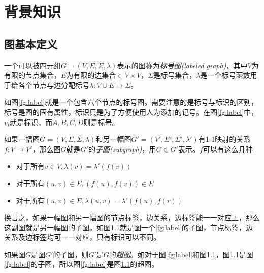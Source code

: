 \documentclass{XDBAthesis}
\begin{document}
\else
\fi
\chapter{背景知识}
\label{chap:background}
\section{图基本定义}
\begin{defn}[标号图]\cite{ghash}
    一个可以被四元组$G=(V,E,\Sigma,\lambda)$表示的图称为\emph{标号图(labeled graph)}，其中$V$为有限的节点集合，$E$为有限的边集合$\in V\times V$，$\Sigma$是标号集合，$\lambda$是一个标号函数用于给各个节点与边分配标号$\lambda :V\cup E\rightarrow\Sigma$。
\end{defn}
如图\ref{fg:label}就是一个包含六个节点的标号图。需要注意的是标号与标识的区别，标号是图的固有属性，标识只是为了方便使用人为添加的记号。在图\ref{fg:label}中，$v_i $就是标识，而$A,B,C,D$则是标号。

\begin{figure}[htp]
    \begin{minipage}{0.5\textwidth}
        \centering
        
        \label{fg:label}
    \end{minipage}%
    \begin{minipage}{0.5\textwidth}
        \centering
        
        \label{fg:sub}
    \end{minipage}\hfill
\end{figure}
\begin{defn}[子图]
    如果一幅图$G=(V,E,\Sigma,\lambda)$和另一幅图$G'=(V',E',\Sigma',\lambda')$有1-1映射的关系$f:V\rightarrow V'$，那么图$G$就是$G'$的\emph{子图(subgraph)}，用$G\in G' $表示。$f$可以有这么几种
\begin{itemize}
    \item 对于所有$v\in V,\lambda(v)=\lambda '(f(v))$
    \item 对于所有$(u,v)\in E,(f(u),f(v))\in E$
    \item 对于所有$(u,v)\in E,\lambda(u,v)=\lambda '(f(u),f(v)) $
\end{itemize}
\end{defn}
换言之，如果一幅图和另一幅图的节点标签，边关系，边标签能一一对应上，那么这副图就是另一幅图的子图。如图\ref{fg:sub}就是图一个\ref{fg:label}的子图，节点标签，边关系及边标签均可一一对应，只有标识可以不同。
\begin{defn}[超图]
    如果图$G$是图$G'$的子图，则$G'$是$G$的\emph{超图}。如对于图\ref{fg:label}和图\ref{fg:sub}，图\ref{fg:sub}是图\ref{fg:label}的子图，所以图\ref{fg:label}是图\ref{fg:sub}的超图。
\end{defn}
\end{document}
